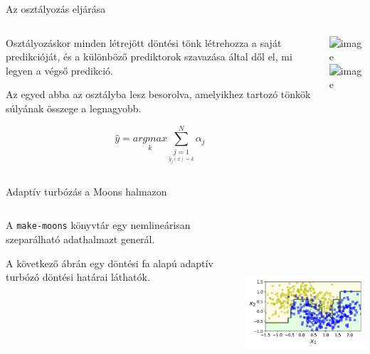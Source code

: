 \documentclass[english, aspectratio=169]{beamer}
\begin{document}
\begin{frame}{Az osztályozás eljárása}
\begin{columns}
\begin{column}{.5\textwidth}
Osztályozáskor minden létrejött döntési tönk létrehozza a saját predikcióját, és a különböző prediktorok szavazása által dől el, mi legyen a végső predikció.\par\medskip
Az egyed abba az osztályba lesz besorolva, amelyikhez tartozó tönkök súlyának összege a legnagyobb. 
\begin{block}{}
\[
\hat{y} = \underset{k}{argmax} \sum_{\underset{\hat{y}_j\left(x\right)=k}{j=1}}^N \alpha_j
\]
\end{block}
\end{column}
\begin{column}{.5\textwidth}
\begin{center}
\includegraphics<1>[height=7cm, keepaspectratio]{graphs/ensemble_2.png}
\includegraphics<2>[height=7cm, keepaspectratio]{graphs/ensemble_3.png}
\end{center}
\end{column}
\end{columns}
\end{frame}

\begin{frame}{Adaptív turbózás a Moons halmazon}
\begin{columns}
\begin{column}{.5\textwidth}
A \texttt{make-moons} könyvtár egy nemlineárisan szeparálható adathalmazt generál.\par\medskip
A következő ábrán egy döntési fa alapú adaptív turbózó döntési határai láthatók.
\end{column}
\begin{column}{.5\textwidth}
\begin{center}
\includegraphics[width=7cm, height=7cm, keepaspectratio]{images/ensemble_8.png}
\end{center}
\end{column}
\end{columns}
\end{frame}
\end{document}
